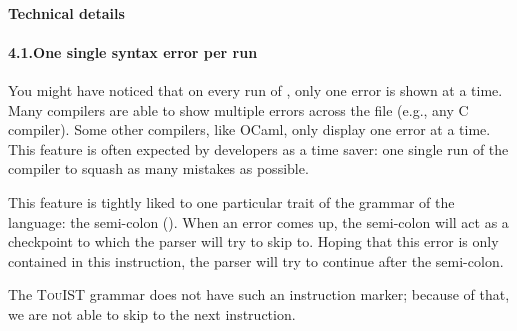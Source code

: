 \paragraph*{Technical details}\label{sec-technical-details}%

\paragraph*{4.1.\hspace*{0.5em}One single syntax error per run}\label{sec-one-single-syntax-error-per-run}%

\noindent You might have noticed that on every run of , only one error is
shown at a time. Many compilers are able to show multiple errors across
the file (e.g., any C compiler). Some other compilers, like OCaml, only
display one error at a time. This feature is often expected by developers
as a time saver: one single run of the compiler to squash as many
mistakes as possible.%

This feature is tightly liked to one particular trait of the grammar of
the language: the semi-colon (\mdcode{;}). When an error comes up, the
semi-colon will act as a checkpoint to which the parser will try to skip
to. Hoping that this error is only contained in this instruction, the
parser will try to continue after the semi-colon.%

The {\scshape TouIST} grammar does not have such an instruction marker; because of
that, we are not able to skip to the next instruction.%
